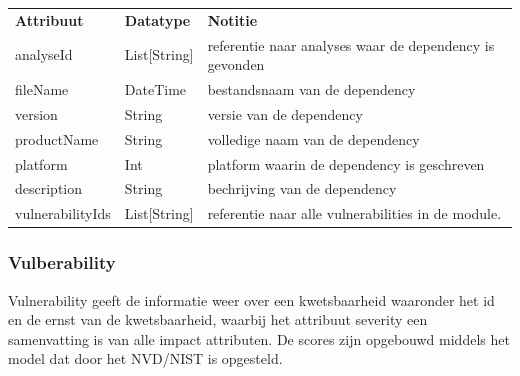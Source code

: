 \begin{tabular}{lll}
    \textbf{Attribuut} & \textbf{Datatype} & \textbf{Notitie}                                        \\
    analyseId          & List[String]      & referentie naar analyses waar de dependency is gevonden \\
    fileName           & DateTime          & bestandsnaam van de dependency                          \\
    version            & String            & versie van de dependency                                \\
    productName        & String            & volledige naam van de dependency                        \\
    platform           & Int               & platform waarin de dependency is geschreven             \\
    description        & String            & bechrijving van de dependency                           \\
    vulnerabilityIds   & List[String]      & referentie naar alle vulnerabilities in de module.      \\
\end{tabular}

\subsubsection{Vulberability}\label{subsubsec:vulberability}
Vulnerability geeft de informatie weer over een kwetsbaarheid waaronder het id en de ernst van de kwetsbaarheid, waarbij het attribuut severity een samenvatting is van alle impact attributen. De scores zijn opgebouwd middels het model dat door het NVD/NIST is opgesteld.

